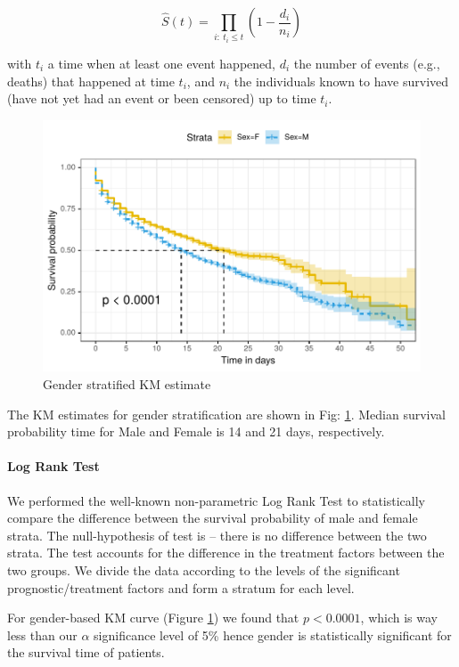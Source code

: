 \documentclass[letterpaper]{article} %
\begin{document}
	
	$$
	\displaystyle {\widehat {S}}(t)=\prod \limits _{i:\ t_{i}\leq t}\left(1-{\frac {d_{i}}{n_{i}}}\right)
	$$
	
	with $t_{i}$ a time when at least one event happened, $d_i$ the number of events (e.g., deaths) that happened at time $t_{i}$, and $n_{i}$ the individuals known to have survived (have not yet had an event or been censored) up to time $t_{i}$.
	
	\begin{figure}[h!]
		\centering
		\includegraphics[width=0.97\linewidth]{sex}
		\caption{Gender stratified KM estimate}
		\label{fig:ks1}
	\end{figure}
	
	The KM estimates for gender stratification are shown in Fig: \ref{fig:ks1}. Median survival probability time  for {Male and Female is 14 and 21 days}, respectively. 
	
	\paragraph{Log Rank Test} We performed the well-known non-parametric Log Rank Test \cite{bland2004logrank} to statistically compare the difference between the survival probability of male and female strata. The  null-hypothesis of test is -- there is no difference between the two strata. 
	The test accounts for the difference in the treatment factors between the two groups. We divide the data according to the levels of the significant prognostic/treatment factors and form a stratum for each level. 
	
	For gender-based KM curve \cite{kaplan1958nonparametric} (Figure \ref{fig:ks1}) we found that $p<0.0001$, which is way less than our  $\alpha$ significance level of 5\% hence gender is statistically significant for the survival time of patients.
	
\end{document}
